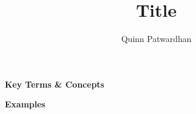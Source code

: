 \documentclass{article}
\title{Title}
\author{Quinn Patwardhan}
\begin{document}
\maketitle

\textbf{Key Terms \& Concepts}

\textbf{Examples}
\end{document}
